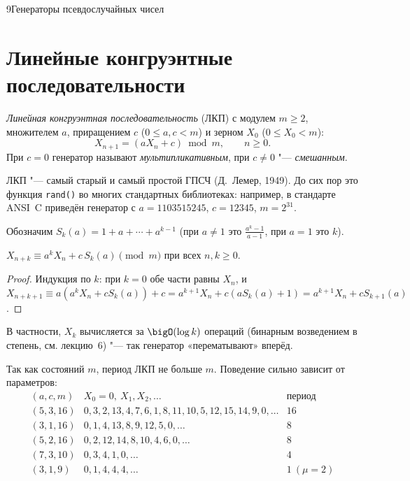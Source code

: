 \begin{lecture}{9}{Генераторы псевдослучайных чисел}

\section{Линейные конгруэнтные последовательности}

\begin{definition}
\emph{Линейная конгруэнтная последовательность} (ЛКП) с модулем $m \ge 2$, множителем $a$,
приращением $c$ ($0 \le a, c < m$) и зерном $X_0$ ($0 \le X_0 < m$):
\[
  X_{n+1} = (a X_n + c) \bmod m, \qquad n \ge 0.
\]
При $c = 0$ генератор называют \emph{мультипликативным}, при $c \ne 0$ "--- \emph{смешанным}.
\end{definition}

ЛКП "--- самый старый и самый простой ГПСЧ (Д.~Лемер, 1949). До сих пор это функция
\texttt{rand()} во многих стандартных библиотеках: например, в стандарте ANSI~C приведён
генератор с $a = 1103515245$, $c = 12345$, $m = 2^{31}$.

Обозначим $S_k(a) = 1 + a + \cdots + a^{k-1}$ (при $a \ne 1$ это $\frac{a^k - 1}{a - 1}$, при $a = 1$
это $k$).

\begin{proposition}\label{l9:lcg-closed}
$X_{n + k} \equiv a^k X_n + c\, S_k(a) \pmod m$ при всех $n, k \ge 0$.
\end{proposition}

\begin{proof}
Индукция по $k$: при $k = 0$ обе части равны $X_n$, и
$X_{n+k+1} \equiv a(a^k X_n + c S_k(a)) + c = a^{k+1} X_n + c (a S_k(a) + 1) = a^{k+1} X_n + c S_{k+1}(a)$.
\end{proof}

В частности, $X_k$ вычисляется за $\bigO(\log k)$ операций (бинарным возведением в степень, см.
лекцию~6) "--- так генератор «перематывают» вперёд.

Так как состояний $m$, период ЛКП не больше $m$. Поведение сильно зависит от параметров:
\[
\begin{array}{l|l|c}
  (a, c, m) & X_0 = 0,\ X_1, X_2, \dots & \text{период}\\ \hline
  (5, 3, 16) & 0, 3, 2, 13, 4, 7, 6, 1, 8, 11, 10, 5, 12, 15, 14, 9, 0, \dots & 16\\
  (3, 1, 16) & 0, 1, 4, 13, 8, 9, 12, 5, 0, \dots & 8\\
  (5, 2, 16) & 0, 2, 12, 14, 8, 10, 4, 6, 0, \dots & 8\\
  (7, 3, 10) & 0, 3, 4, 1, 0, \dots & 4\\
  (3, 1, 9) & 0, 1, 4, 4, 4, \dots & 1\ (\mu = 2)
\end{array}
\]


\end{lecture}
